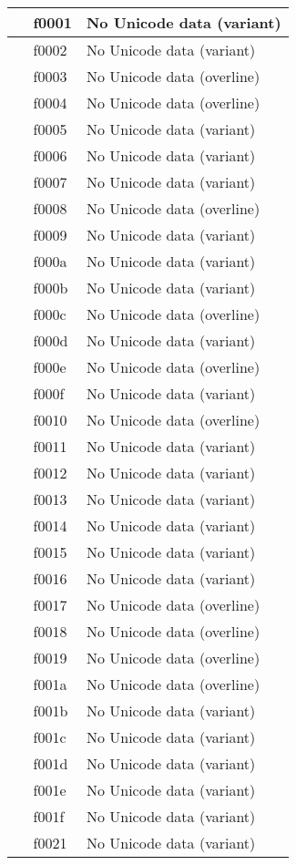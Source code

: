\documentclass[12pt,letterpaper,openany]{book}
\begin{document}
\begin{center}
\begin{supertabular}{|m{0.25in}|m{0.5in}|m{4in}|}
󰀁 & f0001 & No Unicode data (variant)\\\hline
󰀂 & f0002 & No Unicode data (variant)\\\hline
󰀃 & f0003 & No Unicode data (overline)\\\hline
󰀄 & f0004 & No Unicode data (overline)\\\hline
󰀅 & f0005 & No Unicode data (variant)\\\hline
󰀆 & f0006 & No Unicode data (variant)\\\hline
󰀇 & f0007 & No Unicode data (variant)\\\hline
󰀈 & f0008 & No Unicode data (overline)\\\hline
󰀉 & f0009 & No Unicode data (variant)\\\hline
󰀊 & f000a & No Unicode data (variant)\\\hline
󰀋 & f000b & No Unicode data (variant)\\\hline
󰀌 & f000c & No Unicode data (overline)\\\hline
󰀍 & f000d & No Unicode data (variant)\\\hline
󰀎 & f000e & No Unicode data (overline)\\\hline
󰀏 & f000f & No Unicode data (variant)\\\hline
󰀐 & f0010 & No Unicode data (overline)\\\hline
󰀑 & f0011 & No Unicode data (variant)\\\hline
󰀒 & f0012 & No Unicode data (variant)\\\hline
󰀓 & f0013 & No Unicode data (variant)\\\hline
󰀔 & f0014 & No Unicode data (variant)\\\hline
󰀕 & f0015 & No Unicode data (variant)\\\hline
󰀖 & f0016 & No Unicode data (variant)\\\hline
󰀗 & f0017 & No Unicode data (overline)\\\hline
󰀘 & f0018 & No Unicode data (overline)\\\hline
󰀙 & f0019 & No Unicode data (overline)\\\hline
󰀚 & f001a & No Unicode data (overline)\\\hline
󰀛 & f001b & No Unicode data (variant)\\\hline
󰀜 & f001c & No Unicode data (variant)\\\hline
󰀝 & f001d & No Unicode data (variant)\\\hline
󰀞 & f001e & No Unicode data (variant)\\\hline
󰀟 & f001f & No Unicode data (variant)\\\hline
󰀡 & f0021 & No Unicode data (variant)\\\hline
\end{supertabular}
\end{center}
\end{document}
